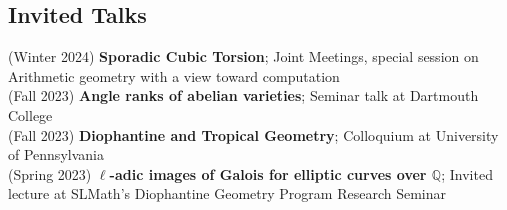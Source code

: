\documentclass[margin,line]{res}
\begin{document}
\begin{resume}
  \section{\sc Invited Talks}
(Winter 2024) \textbf{Sporadic Cubic Torsion};
Joint Meetings, special session on Arithmetic geometry with a view toward computation
\vspace{.05cm}\\  
(Fall 2023) \textbf{Angle ranks of abelian varieties};
Seminar talk at Dartmouth College
\vspace{.05cm}\\  
(Fall 2023) \textbf{Diophantine and Tropical Geometry};
Colloquium at University of Pennsylvania
\vspace{.05cm}\\  
(Spring 2023) \textbf{$\ell$-adic images of Galois for elliptic curves over $\mathbb{Q}$};
Invited lecture at SLMath's Diophantine Geometry Program Research Seminar
\vspace{.05cm}\\  

\end{resume}
\end{document}
